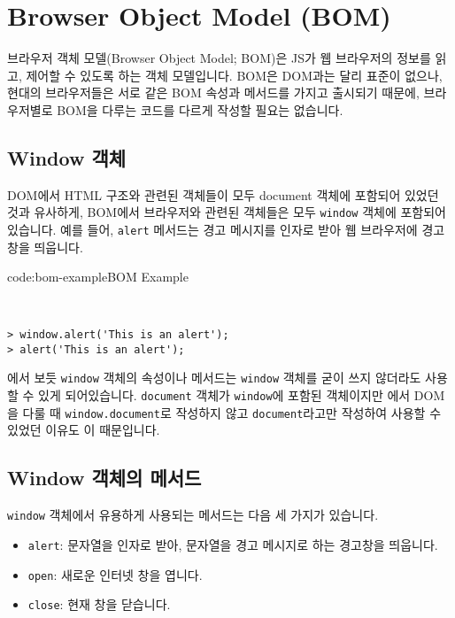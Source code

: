 \section{Browser Object Model (BOM)} \label{sect:browser-object-model}

브라우저 객체 모델(Browser Object Model; BOM)은 JS가 웹 브라우저의 정보를 읽고, 제어할 수 있도록 하는 객체 모델입니다. BOM은 DOM과는 달리 표준이 없으나, 현대의 브라우저들은 서로 같은 BOM 속성과 메서드를 가지고 출시되기 때문에, 브라우저별로 BOM을 다루는 코드를 다르게 작성할 필요는 없습니다.

\subsection*{Window 객체}

DOM에서 HTML 구조와 관련된 객체들이 모두 document 객체에 포함되어 있었던 것과 유사하게, BOM에서 브라우저와 관련된 객체들은 모두 \texttt{window} 객체에 포함되어 있습니다. 예를 들어, \texttt{alert} 메서드는 경고 메시지를 인자로 받아 웹 브라우저에 경고창을 띄웁니다.

\begin{codeenv}{code:bom-example}{BOM Example}\begin{verbatim}


> window.alert('This is an alert');
> alert('This is an alert');
\end{verbatim}
\end{codeenv}

에서 보듯 \texttt{window} 객체의 속성이나 메서드는 \texttt{window} 객체를 굳이 쓰지 않더라도 사용할 수 있게 되어있습니다. \texttt{document} 객체가 \texttt{window}에 포함된 객체이지만 에서 DOM을 다룰 때 \texttt{window.document}로 작성하지 않고 \texttt{document}라고만 작성하여 사용할 수 있었던 이유도 이 때문입니다.

\subsection*{Window 객체의 메서드}

\texttt{window} 객체에서 유용하게 사용되는 메서드는 다음 세 가지가 있습니다.

\begin{itemize}
    \item \texttt{alert}: 문자열을 인자로 받아, 문자열을 경고 메시지로 하는 경고창을 띄웁니다.
    \item \texttt{open}: 새로운 인터넷 창을 엽니다.
    \item \texttt{close}: 현재 창을 닫습니다.
\end{itemize}

